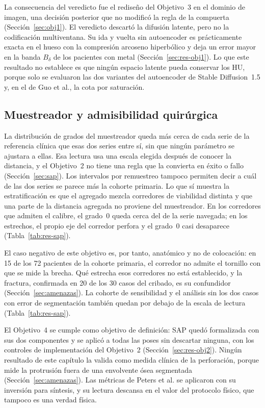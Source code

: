 La consecuencia del veredicto fue el rediseño del Objetivo~3 en el dominio de imagen, una decisión posterior que no modificó la regla de la compuerta (Sección~\ref{sec:obj1}). El veredicto descartó la difusión latente, pero no la codificación multiventana. Su ida y vuelta sin autoencoder es prácticamente exacta en el hueso con la compresión arcoseno hiperbólico y deja un error mayor en la banda $B_{\delta}$ de los pacientes con metal (Sección~\ref{sec:res-obj1}). Lo que este resultado no establece es que ningún espacio latente pueda conservar los HU, porque solo se evaluaron las dos variantes del autoencoder de Stable Diffusion~1.5 y, en el de Guo et al., la cota por saturación.

\subsection{Muestreador y admisibilidad quirúrgica}

La distribución de grados del muestreador queda más cerca de cada serie de la referencia clínica que esas dos series entre sí, sin que ningún parámetro se ajustara a ellas. Esa lectura usa una escala elegida después de conocer la distancia, y el Objetivo~2 no tiene una regla que la convierta en éxito o fallo (Sección~\ref{sec:sap}). Los intervalos por remuestreo tampoco permiten decir a cuál de las dos series se parece más la cohorte primaria. Lo que sí muestra la estratificación es que el agregado mezcla corredores de viabilidad distinta y que una parte de la distancia agregada no proviene del muestreador. En los corredores que admiten el calibre, el grado~0 queda cerca del de la serie navegada; en los estrechos, el propio eje del corredor perfora y el grado~0 casi desaparece (Tabla~\ref{tab:res-sap}).

El caso negativo de este objetivo es, por tanto, anatómico y no de colocación: en 15 de los 72 pacientes de la cohorte primaria, el corredor no admite el tornillo con que se mide la brecha. Qué estrecha esos corredores no está establecido, y la fractura, confirmada en 20 de los 30 casos del cribado, es su confundidor (Sección~\ref{sec:amenazas}). La cohorte de sensibilidad y el análisis sin los dos casos con error de segmentación también quedan por debajo de la escala de lectura (Tabla~\ref{tab:res-sap}).

El Objetivo~4 se cumple como objetivo de definición: SAP quedó formalizada con sus dos componentes y se aplicó a todas las poses sin descartar ninguna, con los controles de implementación del Objetivo~2 (Sección~\ref{sec:res-obj2}). Ningún resultado de este capítulo la valida como medida clínica de la perforación, porque mide la protrusión fuera de una envolvente ósea segmentada (Sección~\ref{sec:amenazas}). Las métricas de Peters et al. se aplicaron con su inversión para síntesis, y su lectura descansa en el valor del protocolo físico, que tampoco es una verdad física.

